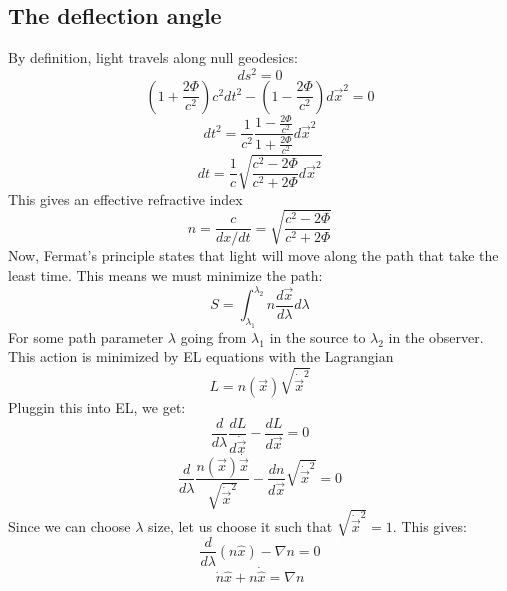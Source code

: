 \documentclass{article}
\begin{document}
\subsection{The deflection angle}
By definition, light travels along null geodesics:
\begin{equation}
    ds^2 = 0
\end{equation}
\begin{equation}
    \left(1 + \frac{2\Phi}{c^2}\right)c^2dt^2 - \left(1 - \frac{2\Phi}{c^2}\right)d\vec{x}^2 = 0
\end{equation}
\begin{equation}
    dt^2 = \frac{1}{c^2}\frac{1 - \frac{2\Phi}{c^2}}{1 + \frac{2\Phi}{c^2}}d\vec{x}^2
\end{equation}
\begin{equation}
    dt = \frac{1}{c}\sqrt{\frac{c^2 - 2\Phi}{c^2 + 2\Phi}d\vec{x}^2}
\end{equation}
This gives an effective refractive index
\begin{equation}
    n = \frac{c}{dx/dt} = \sqrt{\frac{c^2 - 2\Phi}{c^2 + 2\Phi}}
\end{equation}
Now, Fermat's principle states that light will move along the path that take the least time. This means we must minimize the path:
\begin{equation}
    S = \int_{\lambda_1}^{\lambda_2} n \frac{d\vec{x}}{d\lambda} d\lambda
\end{equation}
For some path parameter $\lambda$ going from $\lambda_1$ in the source to $\lambda_2$ in the observer. This action is minimized by EL equations with the Lagrangian
\begin{equation}
    L = n(\vec{x}) \sqrt{\dot{\vec{x}}^2}
\end{equation}
Pluggin this into EL, we get:
\begin{equation}
    \frac{d}{d\lambda}\frac{dL}{d\dot{\vec{x}}} - \frac{dL}{d\vec{x}} = 0 
\end{equation}
\begin{equation}
    \frac{d}{d\lambda}\frac{n(\vec{x})\dot\vec{x}}{\sqrt{\dot{\vec{x}}^2}} - \frac{dn}{d\vec{x}}\sqrt{\dot{\vec{x}}^2} = 0 
\end{equation}
Since we can choose $\lambda$ size, let us choose it such that $\sqrt{\dot{\vec{x}}^2} = 1$. This gives:
\begin{equation}
    \frac{d}{d\lambda}\left(n\hat{x}\right) - \nabla n = 0
\end{equation}
\begin{equation}
    \dot{n}\hat{x} + n\dot{\hat{x}} = \nabla n
\end{equation}
\end{document}
